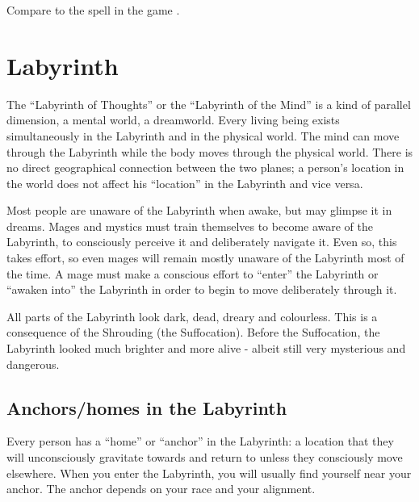 Compare to the spell  in the game \cite{VideoGame:DiabloII}. 















\section{Labyrinth}
The “Labyrinth of Thoughts” or the “Labyrinth of the Mind” is a kind of parallel dimension, a mental world, a dreamworld. Every living being exists simultaneously in the Labyrinth and in the physical world. The mind can move through the Labyrinth while the body moves through the physical world. There is no direct geographical connection between the two planes; a person’s location in the world does not affect his “location” in the Labyrinth and vice versa. 

Most people are unaware of the Labyrinth when awake, but may glimpse it in dreams. Mages and mystics must train themselves to become aware of the Labyrinth, to consciously perceive it and deliberately navigate it. Even so, this takes effort, so even mages will remain mostly unaware of the Labyrinth most of the time. A mage must make a conscious effort to “enter” the Labyrinth or “awaken into” the Labyrinth in order to begin to move deliberately through it.

All parts of the Labyrinth look dark, dead, dreary and colourless. This is a consequence of the Shrouding (the Suffocation). Before the Suffocation, the Labyrinth looked much brighter and more alive - albeit still very mysterious and dangerous.









\subsection{Anchors/homes in the Labyrinth}
Every person has a “home” or “anchor” in the Labyrinth: a location that they will unconsciously gravitate towards and return to unless they consciously move elsewhere. When you enter the Labyrinth, you will usually find yourself near your anchor. The anchor depends on your race and your alignment. 

